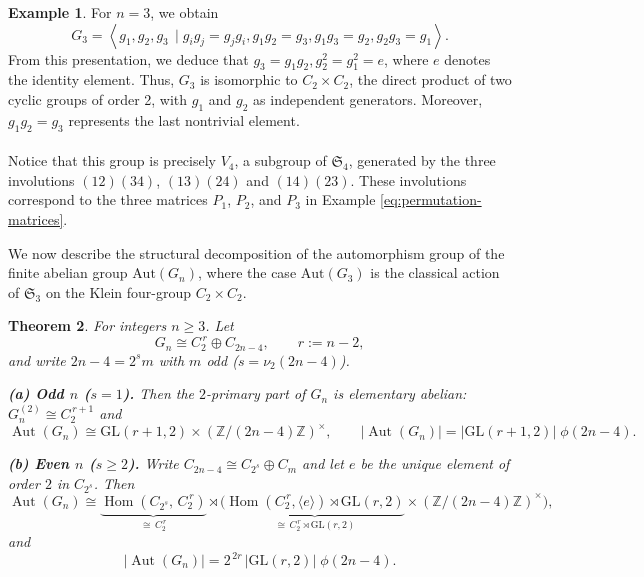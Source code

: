 \documentclass[11pt]{amsart}
\newcommand{\Z}{\mathbb{Z}}
\theoremstyle{plain}
\newtheorem{theorem}{Theorem}[section]
\theoremstyle{definition}
\newtheorem{ex}[theorem]{Example}
\theoremstyle{remark}
\begin{document}
\begin{ex}
	For \(n = 3\), we obtain
	\[ G_3 = \left\langle g_1, g_2, g_3\, \mid g_ig_j=g_jg_i, g_1g_2=g_3, g_1g_3=g_2, g_2g_3=g_1 \right\rangle. \] From this presentation, we deduce that \( g_3 =g_1g_2,  g_2^2 = g_1^2 = e \), where \( e \) denotes the identity element. Thus, \( G_3 \) is isomorphic to \( C_2 \times C_2 \), the direct product of two cyclic groups of order 2, with \(g_1\) and \(g_2\) as independent generators. Moreover, \(g_1g_2=g_3\) represents the last nontrivial element.\\\\ Notice that this group is precisely \(V_4\), a subgroup of \(\mathfrak{S}_{4}\), generated by the three involutions \( (12)(34) \), \( (13)(24) \) and \( (14)(23) \). These involutions correspond to the three matrices \(P_1\), \(P_2\), and \( P_3 \) in Example \ref{eq:permutation-matrices}.
\end{ex}

We now describe the structural decomposition of the automorphism group of the finite abelian group {\(\text{Aut}(G_n)\)}, where the case \(\text{Aut}(G_3)\) is the classical action of \( \mathfrak{S}_3 \) on the Klein four-group \( C_2 \times C_2 \).

\begin{theorem}
\label{thm:structure_aut_Gn}
	For integers \(n \geq 3\). Let
\[
G_n \cong C_2^{\,r}\oplus C_{2n-4},\qquad r:=n-2,
\]
and write $2n-4=2^{s}m$ with $m$ odd ($s=\nu_2(2n-4)$).

\smallskip
\noindent\textbf{(a) Odd $n$ ($s=1$).}
Then the $2$-primary part of $G_n$ is elementary abelian: $G_n^{(2)}\cong C_2^{\,r+1}$ and
\[
\operatorname{Aut}(G_n)\cong \mathrm{GL}(r\!+\!1,2)\times (\Z/(2n-4)\Z)^\times,
\qquad
|\operatorname{Aut}(G_n)|=|\mathrm{GL}(r\!+\!1,2)|\;\phi(2n-4).
\]

\smallskip
\noindent\textbf{(b) Even $n$ ($s\ge2$).}
Write $C_{2n-4}\cong C_{2^{s}}\oplus C_m$ and let $e$ be the unique element of order $2$ in $C_{2^{s}}$.
Then
\[
\operatorname{Aut}(G_n)\cong
\underbrace{\operatorname{Hom}(C_{2^{s}},\,C_2^{\,r})}_{\cong\,C_2^{\,r}}
\rtimes
\Big(
\underbrace{\operatorname{Hom}(C_2^{\,r},\langle e\rangle)\rtimes \mathrm{GL}(r,2)}_{\cong\,C_2^{\,r}\rtimes \mathrm{GL}(r,2)}
\times (\Z/(2n-4)\Z)^\times
\Big),
\]
and
\[
|\operatorname{Aut}(G_n)|=2^{\,2r}\,|\mathrm{GL}(r,2)|\;\phi(2n-4).
\]

\end{theorem}
\end{document}
